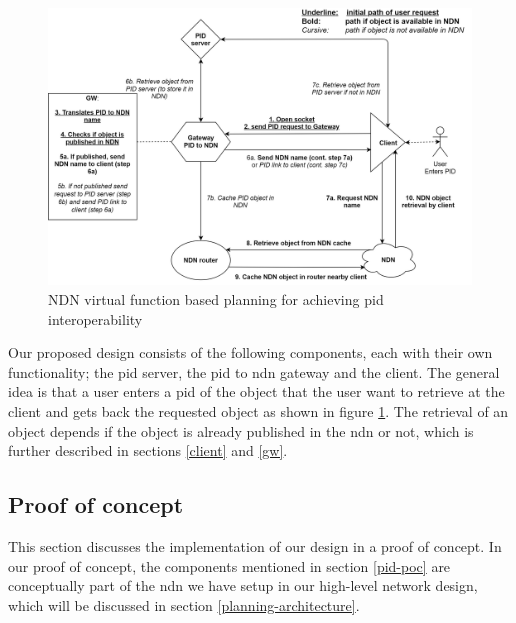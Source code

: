 \begin{figure}[H]
\centering
\includegraphics[width=\textwidth]{Images/PIDtoNDN11.png}
\caption{NDN virtual function based 
planning for achieving \gls{pid} interoperability}
\label{fig:sdc_model}
\end{figure}

Our proposed design consists of the following components, each with their own functionality; the \gls{pid} server, the \gls{pid} to \gls{ndn} gateway and the client. The general idea is that a user enters a \gls{pid} of the object that the user want to retrieve at the client and gets back the requested object as shown in figure \ref{fig:sdc_model}. The retrieval of an object depends if the object is already published in the \gls{ndn} or not, which is further described in sections \ref{client} and \ref{gw}.

\subsection{Proof of concept} 
This section discusses the implementation of our design in a proof of concept.
In our proof of concept, the components mentioned in section \ref{pid-poc} are conceptually part of the \gls{ndn} we have setup in our high-level network design, which will be discussed in section \ref{planning-architecture}.


